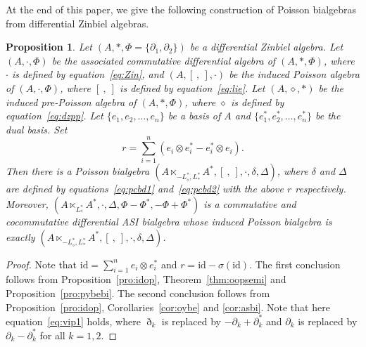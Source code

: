 \documentclass[pdftex]{sigma}
\numberwithin{equation}{section}
\newtheorem{Proposition}[Theorem]{Proposition}
{ \theoremstyle{definition}
	\newtheorem{Definition}[Theorem]{Definition}
	\newtheorem{Note}[Theorem]{Note}
	\newtheorem{Example}[Theorem]{Example}
	\newtheorem{Remark}[Theorem]{Remark} }
\newcommand{\id}{\mathrm{id}}
\begin{document}
At the end of this paper, we give the following construction of Poisson bialgebras from differential Zinbiel algebras.

\begin{Proposition}Let $(A, \ast, \Phi = \{\partial_1, \partial_2\})$ be a differential Zinbiel algebra.
 Let $(A, \cdot, \Phi)$ be the associated commutative differential algebra of $(A, \ast, \Phi)$,
 where $\cdot$ is defined by equation~\eqref{eq:Zin}, and $(A, [\ ,\ ], \cdot)$ be the induced Poisson algebra of $(A, \cdot, \Phi)$, where $[\ ,\ ]$ is defined by equation~\eqref{eq:lie}.
 Let $(A, \diamond, \ast)$ be the induced pre-Poisson algebra of $(A, \ast, \Phi)$, where $\diamond$ is defined by equation~\eqref{eq:dzpp}.
 Let $\{e_1, e_2,\dots, e_n\}$ be a basis of $A$ and $\{e_1^*, e_2^*, \dots, e_n^*\}$ be the dual basis.
 Set
 \begin{equation*}
 r = \sum_{i=1}^n (e_i \otimes e_i^* - e_i^* \otimes e_i).
 \end{equation*}
 Then there is a Poisson bialgebra $(A \ltimes_{-L^*_{\diamond},L^*_{\ast}} A^*, [\ ,\ ], \cdot, \delta, \Delta)$,
 where $\delta$ and $\Delta$ are defined by equations~\eqref{eq:pcbd1} and~\eqref{eq:pcbd2} with the above $r$ respectively.
 Moreover, $(A \ltimes_{L^*_{\ast}}A^*, \cdot, \Delta, \Phi - \Phi^*, -\Phi + \Phi^*)$
 is a commutative and cocommutative differential ASI bialgebra
 whose induced Poisson bialgebra is exactly $(A \ltimes_{-L^*_{\diamond},L^*_{\ast}} A^*, [\ ,\ ], \cdot, \delta, \Delta)$.
\end{Proposition}
\begin{proof}
 Note that $\id = \sum^n_{i=1} e_i\otimes e_i^*$ and $r = \id - \sigma(\id)$.
 The first conclusion follows from Proposition~\ref{pro:idop}, Theorem~\ref{thm:oopsemi} and Proposition~\ref{pro:pybebi}.
 The second conclusion follows from Proposition~\ref{pro:idop}, Corollaries~\ref{cor:oybe} and \ref{cor:asbi}.
 Note that here equation~\eqref{eq:vip1} holds, where $\eth_k$ is replaced by $-\partial_k + \partial_k^*$ and $\partial_k$ is replaced by $\partial_k - \partial_k^*$ for all $k=1, 2$.
\end{proof}
\end{document}
